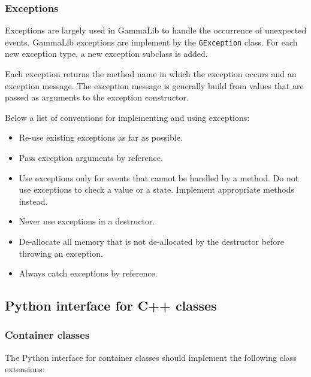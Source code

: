 \documentclass{article}[12pt,a4]
\begin{document}
\subsubsection{Exceptions}
\label{sec:exceptions}

Exceptions are largely used in GammaLib to handle the occurrence of unexpected events.
GammaLib exceptions are implement by the {\tt GException} class.
For each new exception type, a new exception subclass is added.

Each exception returns the method name in which the exception occurs and an exception
message.
The exception message is generally build from values that are passed as arguments to the
exception constructor.

Below a list of conventions for implementing and using exceptions:
\begin{itemize}
\item Re-use existing exceptions as far as possible.
\item Pass exception arguments by reference.
\item Use exceptions only for events that cannot be handled by a method.
Do not use exceptions to check a value or a state. Implement appropriate methods instead.
\item Never use exceptions in a destructor.
\item De-allocate all memory that is not de-allocated by the destructor before throwing an
exception. 
\item Always catch exceptions by reference.
\end{itemize}


\subsection{Python interface for C++ classes}

\subsubsection{Container classes}

The Python interface for container classes should implement the following class extensions:
\end{document}
